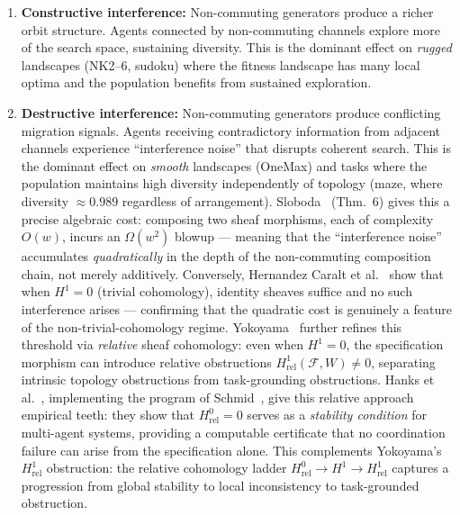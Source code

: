 \begin{enumerate}
\item \textbf{Constructive interference:} Non-commuting generators
  produce a richer orbit structure.  Agents connected by
  non-commuting channels explore more of the search space, sustaining
  diversity.  This is the dominant effect on \emph{rugged} landscapes
  (NK2--6, sudoku) where the fitness landscape has many local optima
  and the population benefits from sustained exploration.

\item \textbf{Destructive interference:} Non-commuting generators
  produce conflicting migration signals.  Agents receiving
  contradictory information from adjacent channels experience
  ``interference noise'' that disrupts coherent search.  This is the
  dominant effect on \emph{smooth} landscapes (OneMax) and tasks where
  the population maintains high diversity independently of topology
  (maze, where diversity $\approx 0.989$ regardless of arrangement).
  Sloboda~\cite{sloboda2026composition} (Thm.~6) gives this a precise
  algebraic cost: composing two sheaf morphisms, each of complexity
  $O(w)$, incurs an $\Omega(w^2)$ blowup --- meaning that the
  ``interference noise'' accumulates \emph{quadratically} in the depth
  of the non-commuting composition chain, not merely additively.
  Conversely, Hernandez Caralt et al.~\cite{hernandez2026identity} show
  that when $H^1 = 0$ (trivial cohomology), identity sheaves suffice
  and no such interference arises --- confirming that the quadratic
  cost is genuinely a feature of the non-trivial-cohomology regime.
  Yokoyama~\cite{yokoyama2026relative} further refines this threshold
  via \emph{relative} sheaf cohomology: even when $H^1 = 0$, the
  specification morphism can introduce relative obstructions
  $H^1_{\mathrm{rel}}(\mathcal{F}, W) \neq 0$, separating intrinsic
  topology obstructions from task-grounding obstructions.
  Hanks et al.~\cite{hanks2025relative}, implementing the program of
  Schmid~\cite{schmid2025prospectus}, give this relative approach
  empirical teeth: they show that $H^0_{\mathrm{rel}} = 0$ serves as a
  \emph{stability condition} for multi-agent systems, providing a
  computable certificate that no coordination failure can arise from the
  specification alone.  This complements Yokoyama's $H^1_{\mathrm{rel}}$
  obstruction: the relative cohomology ladder
  $H^0_{\mathrm{rel}} \to H^1 \to H^1_{\mathrm{rel}}$
  captures a progression from global stability to local inconsistency to
  task-grounded obstruction.


\end{enumerate}
